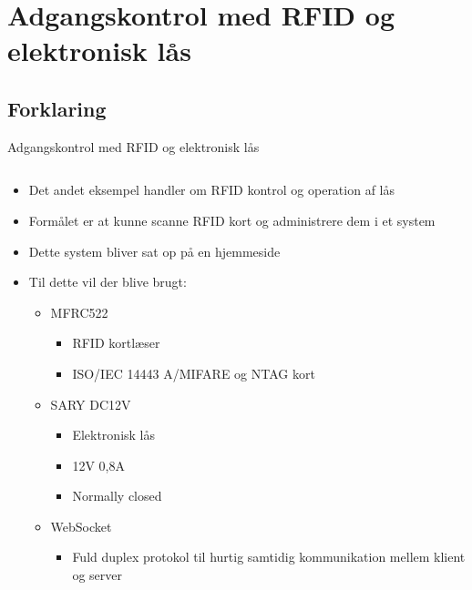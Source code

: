 \documentclass[aspectratio=169]{beamer}
\begin{document}
\section{Adgangskontrol med RFID og elektronisk lås}
\begin{frame}
\end{frame}

\subsection{Forklaring}
\begin{frame}{Adgangskontrol med RFID og elektronisk lås}
\begin{columns}
	\begin{column}{0.6\textwidth}
		\begin{textBox}
			\begin{itemize}
				\item Det andet eksempel handler om RFID kontrol og operation af lås
				\item Formålet er at kunne scanne RFID kort og administrere dem i et system
				\item Dette system bliver sat op på en hjemmeside
				\item Til dette vil der blive brugt:
				\begin{itemize}
					\item MFRC522
					\begin{itemize}
						\item RFID kortlæser
						\item ISO/IEC 14443 A/MIFARE og NTAG kort
					\end{itemize}
					\item SARY DC12V
					\begin{itemize}
						\item Elektronisk lås
						\item 12V 0,8A
						\item Normally closed
					\end{itemize}
					\item WebSocket 
					\begin{itemize}
						\item Fuld duplex protokol til hurtig samtidig kommunikation mellem klient og server
					\end{itemize}
				\end{itemize}
			\end{itemize}
		\end{textBox}

\end{column}
\end{columns}
\end{frame}
\end{document}
